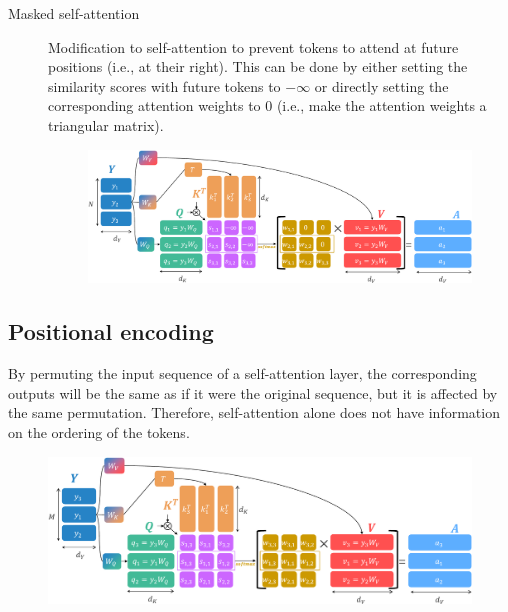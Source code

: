 \begin{description}
        \begin{description}
            \item[Masked self-attention] 
                Modification to self-attention to prevent tokens to attend at future positions (i.e., at their right). This can be done by either setting the similarity scores with future tokens to $-\infty$ or directly setting the corresponding attention weights to $0$ (i.e., make the attention weights a triangular matrix).

                \begin{figure}[H]
                    \centering
                    \includegraphics[width=0.8\linewidth]{./img/_masked_self_attention.pdf}
                \end{figure}
        \end{description}
\end{description}


\subsection{Positional encoding}

\begin{remark}
    By permuting the input sequence of a self-attention layer, the corresponding outputs will be the same as if it were the original sequence, but it is affected by the same permutation. Therefore, self-attention alone does not have information on the ordering of the tokens.

    \begin{figure}[H]
        \centering
        \includegraphics[width=0.8\linewidth]{./img/_self_attention_permutation.pdf}
    \end{figure}
\end{remark}


